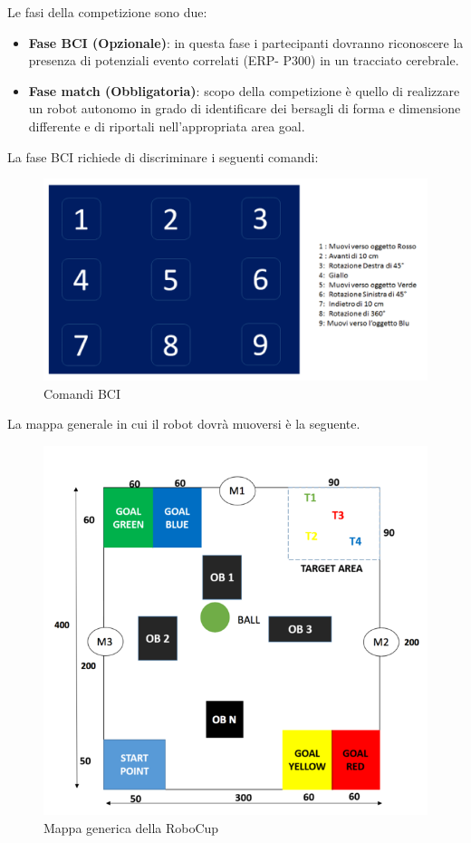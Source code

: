 \documentclass[a4paper,12pt,italian]{article}
\begin{document}
Le fasi della competizione sono due:
\begin{itemize}
	\item \textbf{Fase BCI (Opzionale)}: in questa fase i partecipanti dovranno riconoscere la presenza di potenziali evento correlati (ERP- P300) in un tracciato cerebrale.
	\item \textbf{Fase match (Obbligatoria)}: scopo della competizione è quello di realizzare un robot autonomo in grado di identificare dei bersagli di forma e dimensione differente e di riportali nell’appropriata area goal.
\end{itemize}

La fase BCI richiede di discriminare i seguenti comandi:
\begin{figure}[H]
\begin{center}
\includegraphics[scale=0.4]{BCI}
\caption{Comandi BCI}
\end{center}
\end{figure}

La mappa generale in cui il robot dovrà muoversi è la seguente.

\begin{figure}[H]
\begin{center}
\includegraphics[scale=0.5]{mappa}
\caption{Mappa generica della RoboCup}
\label{Fig:mappa}
\end{center}
\end{figure}
\end{document}

